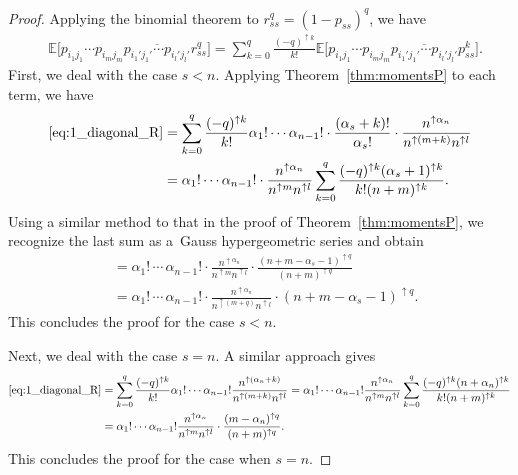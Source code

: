 \documentclass[pdftex]{sigma}
\numberwithin{equation}{section}
\theoremstyle{definition}
\begin{document}
\begin{proof}
Applying the binomial theorem to $r_{ss}^q=(1-p_{ss})^q$, we have
\begin{align}
&\mathbb{E} \bigl[p_{i_1 j_1} \cdots p_{i_m j_m} \overline{p_{i_1' j_1'} \cdots p_{i_l' j_l'}} r_{ss}^q\bigr] = \sum_{k=0}^q \frac{(-q)^{\uparrow k}}{k!} \mathbb{E} \bigl[p_{i_1 j_1} \cdots p_{i_m j_m} \overline{p_{i_1' j_1'} \cdots p_{i_l' j_l'}}p_{ss}^k \bigr]. \label{eq:1_diagonal_R}
\end{align}
First, we deal with the case $s <n$. Applying Theorem~\ref{thm:momentsP} to each term, we have
\begin{align*}
\begin{split}
\eqref{eq:1_diagonal_R} &=
 \sum_{k=0}^q \frac{(-q)^{\uparrow k}}{k!} \alpha_1! \cdots \alpha_{n-1}! \cdot \frac{(\alpha_s+ k)!}{\alpha_s!}
 \cdot \frac{n^{\uparrow \alpha_n}}{n^{\uparrow (m+k)} n^{\uparrow l}} \\
 &= \alpha_1! \cdots \alpha_{n-1}! \cdot \frac{n^{\uparrow \alpha_n}}{n^{\uparrow m} n^{\uparrow l}} \sum_{k=0}^q \frac{(-q)^{\uparrow k} (\alpha_s+1)^{\uparrow k}}{k! (n+m)^{\uparrow k}}.
 \end{split}
\end{align*}
Using a similar method to that in the proof of Theorem~\ref{thm:momentsP}, we recognize the last sum as a~Gauss hypergeometric series and obtain
\begin{align*}
 &= \alpha_1!\, \cdots \, \alpha_{n-1}! \cdot \frac{n^{\uparrow \alpha_n}}{n^{\uparrow m} n^{\uparrow l}} \cdot \frac{(n+m-\alpha_s-1)^{\uparrow q}}{(n+m)^{\uparrow q}} \\
 &= \alpha_1!\, \cdots \, \alpha_{n-1}! \cdot \frac{n^{\uparrow \alpha_n}}{n^{\uparrow (m+q)} n^{\uparrow l}} \cdot (n+m-\alpha_s-1)^{\uparrow q}.
\end{align*}
This concludes the proof for the case $s < n$.

Next, we deal with the case $s =n$. A similar approach gives
\begin{align*}
\eqref{eq:1_diagonal_R} &= \sum_{k=0}^q \frac{(-q)^{\uparrow k}}{k!} \alpha_1! \cdots \alpha_{n-1}! \frac{n^{\uparrow (\alpha_n +k)}}{n^{\uparrow (m+k)} n^{\uparrow l}}
 = \alpha_1! \cdots \alpha_{n-1}! \frac{n^{\uparrow \alpha_n}}{n^{\uparrow m} n^{\uparrow l}}\sum_{k=0}^q \frac{(-q)^{\uparrow k} (n+\alpha_n)^{\uparrow k}}{k! (n+m)^{\uparrow k}} \\
&=\alpha_1! \cdots \alpha_{n-1}! \frac{n^{\uparrow \alpha_n}}{n^{\uparrow m} n^{\uparrow l}} \cdot \frac{(m-\alpha_n)^{\uparrow q}}{(n+m)^{\uparrow q}}.
\end{align*}
This concludes the proof for the case when $s = n$.
\end{proof}
\end{document}
